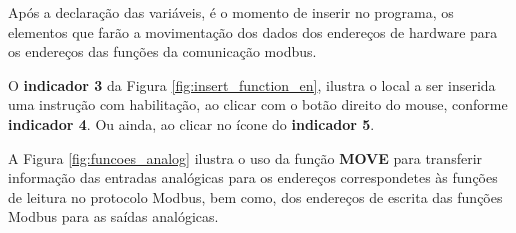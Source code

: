 \begin{figure}[ht!]
	\centering
\end{figure}


Após a declaração das variáveis, 
é o momento de inserir no programa, 
os elementos que farão a movimentação dos dados 
dos endereços de hardware para 
os endereços das funções da comunicação modbus. 

O \textbf{indicador 3} da Figura \ref{fig:insert_function_en}, 
ilustra o local a ser inserida uma instrução com habilitação, 
ao clicar com o botão direito do mouse, conforme \textbf{indicador 4}. 
Ou ainda, ao clicar no ícone do \textbf{indicador 5}.


A Figura \ref{fig:funcoes_analog} ilustra o uso da função 
\textbf{MOVE} para transferir informação das entradas analógicas 
para os endereços correspondetes às funções de leitura no 
protocolo Modbus, bem como, 
dos endereços de escrita das funções Modbus para as saídas analógicas. 

\begin{figure}[ht!]
	\centering
\end{figure}


